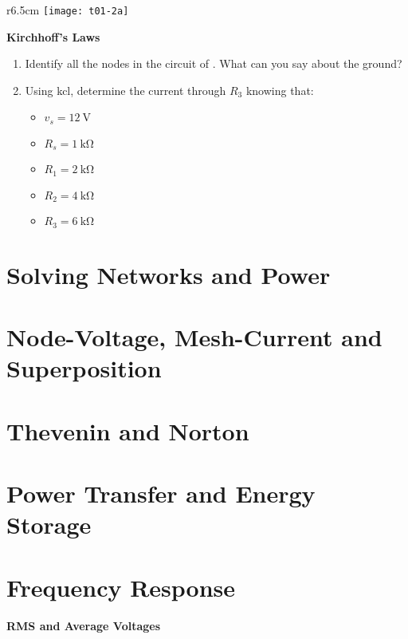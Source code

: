 \documentclass[10pt,a4paper]{memoir}
\begin{document}
\newpage
\begin{question}
  \begin{wrapfigure}{r}{6.5cm}
    \centering
    \texttt{[image: t01-2a]}
    \caption{}
    \label{fig:t01-2a}
  \end{wrapfigure}
  \textbf{Kirchhoff's Laws}
  \begin{enumerate}
    \item Identify all the nodes in the circuit of . What can you say about the ground?
    \item Using \ac{kcl}, determine the current through $R_3$ knowing that:
    \begin{itemize}
      \item $v_s = \SI{12}{\volt}$
      \item $R_s = \SI{1}{\kilo\ohm}$
      \item $R_1 = \SI{2}{\kilo\ohm}$
      \item $R_2 = \SI{4}{\kilo\ohm}$
      \item $R_3 = \SI{6}{\kilo\ohm}$
    \end{itemize}
  \end{enumerate}
\end{question}
\begin{solution}
  \begin{figure}[!h]
    \centering
    \missingfigure[figwidth=6cm]{}
  \end{figure}
\end{solution}

\chapter{Solving Networks and Power}
\chapter{Node-Voltage, Mesh-Current and Superposition}
\chapter{Thevenin and Norton}
\chapter{Power Transfer and Energy Storage}

\chapter{Frequency Response}
\newpage
\begin{question}
  \textbf{RMS and Average Voltages}
  \begin{figure}[!h]
    \centering
    \missingfigure[figwidth=6cm]{}
    \caption{}
  \end{figure}
\end{question}
\end{document}
